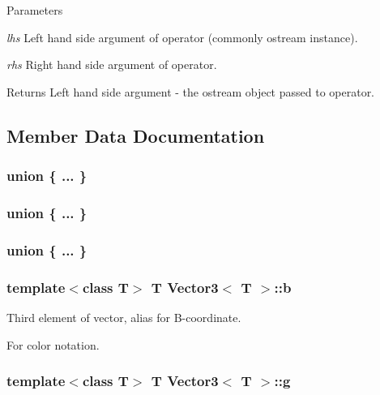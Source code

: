 \begin{DoxyParams}{Parameters}
\item[{\em lhs}]Left hand side argument of operator (commonly ostream instance). \item[{\em rhs}]Right hand side argument of operator. \end{DoxyParams}
\begin{DoxyReturn}{Returns}
Left hand side argument -\/ the ostream object passed to operator. 
\end{DoxyReturn}


\subsection{Member Data Documentation}
\hypertarget{class_vector3_a7d6d6cb3630e13c2d949088727accbf0}{
\subsubsection[{"@5}]{\setlength{\rightskip}{0pt plus 5cm}union \{ ... \} }}
\label{class_vector3_a7d6d6cb3630e13c2d949088727accbf0}
\hypertarget{class_vector3_a909d7de04b857428afff56ba37cf03c2}{
\subsubsection[{"@7}]{\setlength{\rightskip}{0pt plus 5cm}union \{ ... \} }}
\label{class_vector3_a909d7de04b857428afff56ba37cf03c2}
\hypertarget{class_vector3_a72d53f24e96f0da668f3f2bc97adecd9}{
\subsubsection[{"@9}]{\setlength{\rightskip}{0pt plus 5cm}union \{ ... \} }}
\label{class_vector3_a72d53f24e96f0da668f3f2bc97adecd9}
\hypertarget{class_vector3_a5d0fb92a571771b1611e15e0daeb4826}{
\subsubsection[{b}]{\setlength{\rightskip}{0pt plus 5cm}template$<$class T$>$ T {\bf Vector3}$<$ T $>$::{\bf b}}}
\label{class_vector3_a5d0fb92a571771b1611e15e0daeb4826}


Third element of vector, alias for B-\/coordinate. 

For color notation. \hypertarget{class_vector3_a2cd87f1cae37ddde9a1bc91acfba4b7c}{
\subsubsection[{g}]{\setlength{\rightskip}{0pt plus 5cm}template$<$class T$>$ T {\bf Vector3}$<$ T $>$::{\bf g}}}
\label{class_vector3_a2cd87f1cae37ddde9a1bc91acfba4b7c}


